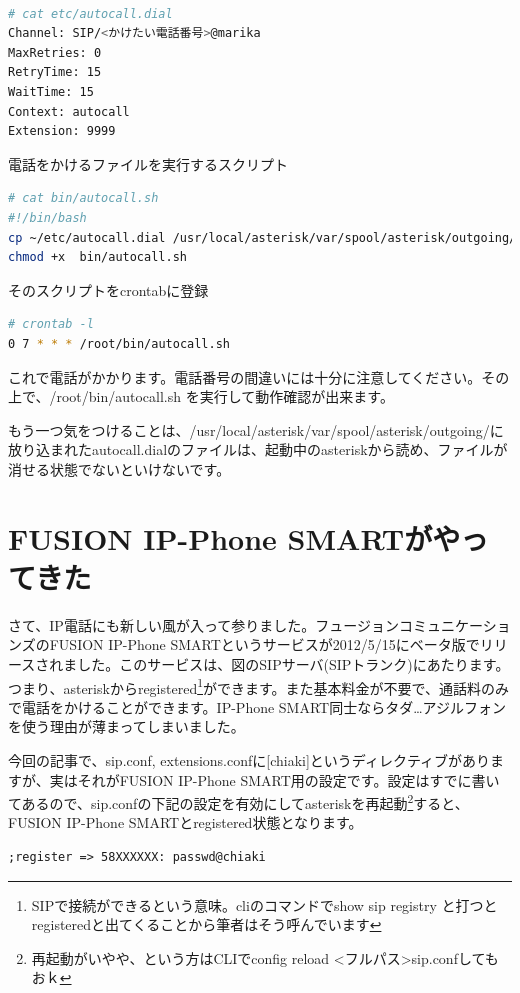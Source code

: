 \begin{lstlisting}[language=bash]

# cat etc/autocall.dial 
Channel: SIP/<かけたい電話番号>@marika
MaxRetries: 0
RetryTime: 15
WaitTime: 15
Context: autocall
Extension: 9999
\end{lstlisting}

電話をかけるファイルを実行するスクリプト

\begin{lstlisting}[language=bash]
# cat bin/autocall.sh 
#!/bin/bash
cp ~/etc/autocall.dial /usr/local/asterisk/var/spool/asterisk/outgoing/
chmod +x  bin/autocall.sh 
\end{lstlisting}

そのスクリプトをcrontabに登録
\begin{lstlisting}[language=bash]
# crontab -l 
0 7 * * * /root/bin/autocall.sh
\end{lstlisting}
これで電話がかかります。電話番号の間違いには十分に注意してください。その上で、/root/bin/autocall.sh を実行して動作確認が出来ます。

もう一つ気をつけることは、/usr/local/asterisk/var/spool/asterisk/outgoing/に放り込まれたautocall.dialのファイルは、起動中のasteriskから読め、ファイルが消せる状態でないといけないです。

\section{FUSION IP-Phone SMARTがやってきた}
さて、IP電話にも新しい風が入って参りました。フュージョンコミュニケーションズのFUSION IP-Phone SMARTというサービスが2012/5/15にベータ版でリリースされました。このサービスは、図のSIPサーバ(SIPトランク)にあたります。つまり、asteriskからregistered\footnote{SIPで接続ができるという意味。cliのコマンドでshow sip registry と打つとregisteredと出てくることから筆者はそう呼んでいます}ができます。また基本料金が不要で、通話料のみで電話をかけることができます。IP-Phone SMART同士ならタダ…アジルフォンを使う理由が薄まってしまいました。

今回の記事で、sip.conf, extensions.confに[chiaki]というディレクティブがありますが、実はそれがFUSION IP-Phone SMART用の設定です。設定はすでに書いてあるので、sip.confの下記の設定を有効にしてasteriskを再起動\footnote{再起動がいやや、という方はCLIでconfig reload <フルパス>sip.confしてもおｋ}すると、FUSION IP-Phone SMARTとregistered状態となります。

\begin{lstlisting}
;register => 58XXXXXX: passwd@chiaki
\end{lstlisting}


